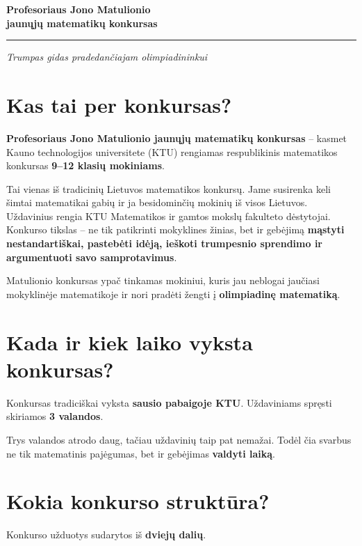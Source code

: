\documentclass[11pt,a4paper]{article}
\begin{document}
\begin{center}
  {\LARGE\bfseries\color{titleblue} Profesoriaus Jono Matulionio\\[2pt]
  jaunųjų matematikų konkursas}\par
  \vspace{0.35em}
  {\color{ruleblue}\rule{0.92\textwidth}{0.8pt}}\par
  \vspace{0.45em}
  {\itshape Trumpas gidas pradedančiajam olimpiadininkui}
\end{center}

\section{Kas tai per konkursas?}

\textbf{Profesoriaus Jono Matulionio jaunųjų matematikų konkursas} -- kasmet Kauno technologijos universitete (KTU) rengiamas respublikinis matematikos konkursas \textbf{9--12 klasių mokiniams}.

Tai vienas iš tradicinių Lietuvos matematikos konkursų. Jame susirenka keli šimtai matematikai gabių ir ja besidominčių mokinių iš visos Lietuvos. Uždavinius rengia KTU Matematikos ir gamtos mokslų fakulteto dėstytojai. Konkurso tikslas -- ne tik patikrinti mokyklines žinias, bet ir gebėjimą \textbf{mąstyti nestandartiškai, pastebėti idėją, ieškoti trumpesnio sprendimo ir argumentuoti savo samprotavimus}.

Matulionio konkursas ypač tinkamas mokiniui, kuris jau neblogai jaučiasi mokyklinėje matematikoje ir nori pradėti žengti į \textbf{olimpiadinę matematiką}.

\section{Kada ir kiek laiko vyksta konkursas?}

Konkursas tradiciškai vyksta \textbf{sausio pabaigoje KTU}. Uždaviniams spręsti skiriamos \textbf{3 valandos}.

Trys valandos atrodo daug, tačiau uždavinių taip pat nemažai. Todėl čia svarbus ne tik matematinis pajėgumas, bet ir gebėjimas \textbf{valdyti laiką}.

\section{Kokia konkurso struktūra?}

Konkurso užduotys sudarytos iš \textbf{dviejų dalių}.
\end{document}
